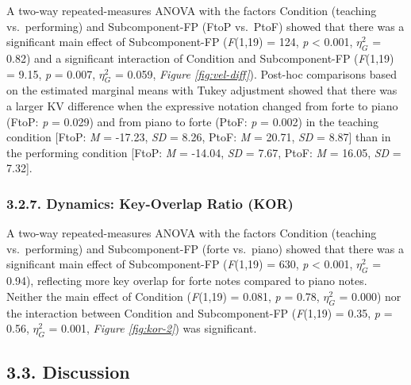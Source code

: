 \documentclass[
  english,
  man,floatsintext]{apa6}
\begin{document}
A two-way repeated-measures ANOVA with the factors Condition (teaching vs.~performing) and Subcomponent-FP (FtoP vs.~PtoF) showed that there was a significant main effect of Subcomponent-FP (\emph{F}(1,19) = 124, \emph{p} \textless{} 0.001, \(\eta_G^2\) = 0.82) and a significant interaction of Condition and Subcomponent-FP (\emph{F}(1,19) = 9.15, \emph{p} = 0.007, \(\eta_G^2\) = 0.059, \emph{Figure \ref{fig:vel-diff}}). Post-hoc comparisons based on the estimated marginal means with Tukey adjustment showed that there was a larger KV difference when the expressive notation changed from forte to piano (FtoP: \emph{p} = 0.029) and from piano to forte (PtoF: \emph{p} = 0.002) in the teaching condition {[}FtoP: \emph{M} = -17.23, \emph{SD} = 8.26, PtoF: \emph{M} = 20.71, \emph{SD} = 8.87{]} than in the performing condition {[}FtoP: \emph{M} = -14.04, \emph{SD} = 7.67, PtoF: \emph{M} = 16.05, \emph{SD} = 7.32{]}.

\hypertarget{dynamics-key-overlap-ratio-kor}{%
\subsubsection{3.2.7. Dynamics: Key-Overlap Ratio (KOR)}\label{dynamics-key-overlap-ratio-kor}}

A two-way repeated-measures ANOVA with the factors Condition (teaching vs.~performing) and Subcomponent-FP (forte vs.~piano) showed that there was a significant main effect of Subcomponent-FP (\emph{F}(1,19) = 630, \emph{p} \textless{} 0.001, \(\eta_G^2\) = 0.94), reflecting more key overlap for forte notes compared to piano notes. Neither the main effect of Condition (\emph{F}(1,19) = 0.081, \emph{p} = 0.78, \(\eta_G^2\) = 0.000) nor the interaction between Condition and Subcomponent-FP (\emph{F}(1,19) = 0.35, \emph{p} = 0.56, \(\eta_G^2\) = 0.001, \emph{Figure \ref{fig:kor-2}}) was significant.

\hypertarget{discussion-1}{%
\subsection{3.3. Discussion}\label{discussion-1}}
\end{document}
